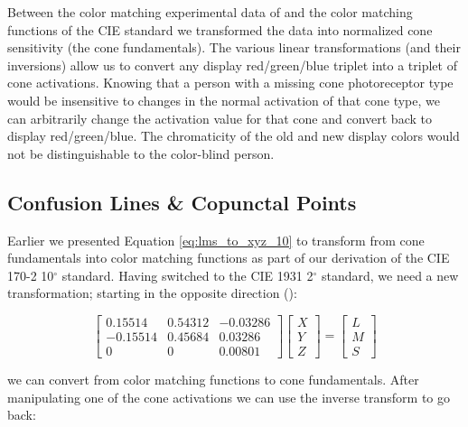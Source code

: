 \documentclass{article}
\begin{document}
\begin{multicols}{2}
Between the color matching experimental data of \cite{stiles1959npl} and the color matching functions of the CIE standard we transformed the data into normalized cone sensitivity (the cone fundamentals).  The various linear transformations (and their inversions) allow us to convert any display red/green/blue triplet into a triplet of cone activations.  Knowing that a person with a missing cone photoreceptor type would be insensitive to changes in the normal activation of that cone type, we can arbitrarily change the activation value for that cone and convert back to display red/green/blue.  The chromaticity of the old and new display colors would not be distinguishable to the color-blind person.

\subsection{Confusion Lines \& Copunctal Points} %

Earlier we presented Equation \ref{eq:lms_to_xyz_10} to transform from cone fundamentals into color matching functions as part of our derivation of the CIE 170-2 10$^\circ$ standard.  Having switched to the CIE 1931 2$^\circ$ standard, we need a new transformation; starting in the opposite direction (\cite{smith1975spectral}):

\begin{equation} %
    \begin{bmatrix}
        0.15514&0.54312&-0.03286\\
        -0.15514&0.45684&0.03286\\
        0&0&0.00801
    \end{bmatrix}\begin{bmatrix}
        X\\
        Y\\
        Z
    \end{bmatrix}=\begin{bmatrix}
        L\\
        M\\
        S
    \end{bmatrix}
\end{equation}

we can convert from color matching functions to cone fundamentals.  After manipulating one of the cone activations we can use the inverse transform to go back:


\end{multicols}
\end{document}

